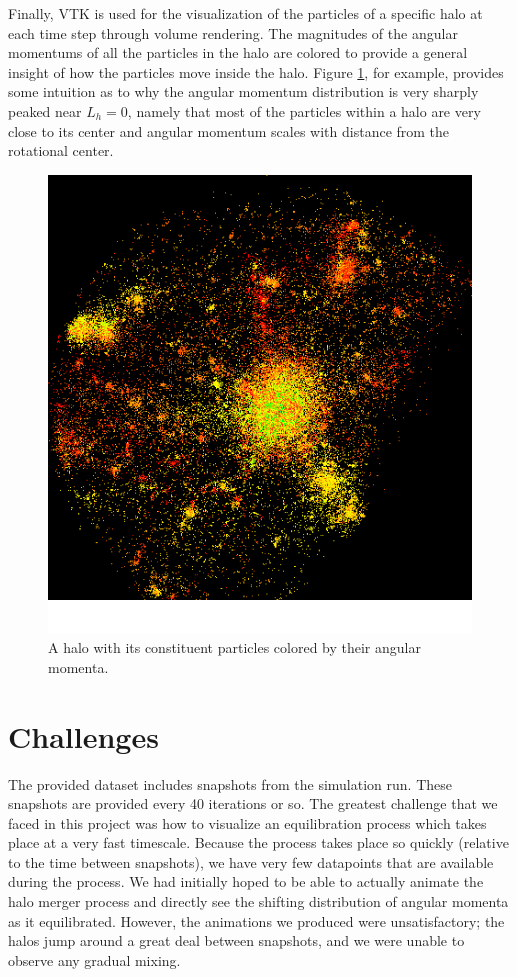 \documentclass[12pt]{article}
\begin{document}
Finally, VTK is used for the visualization of the particles of a specific halo
at each time step through volume rendering. The magnitudes of the angular
momentums of all the particles in the halo are colored to provide a general
insight of how the particles move inside the halo. Figure
\ref{fig:halo_particles}, for example, provides some intuition as to why the
angular momentum distribution is very sharply peaked near $L_h = 0$, namely
that most of the particles within a halo are very close to its center and
angular momentum scales with distance from the rotational center.

\begin{figure}[htp]
\centering
\includegraphics[width=0.5\columnwidth]{../figures/halo_particles.png}
\caption{A halo with its constituent particles colored by their angular momenta.}
\label{fig:halo_particles}
\end{figure}

\section{Challenges}
\label{sec:challenges}
The provided dataset includes snapshots from the simulation run. These
snapshots are provided every 40 iterations or so. The greatest challenge that
we faced in this project was how to visualize an equilibration process which
takes place at a very fast timescale. Because the process takes place so
quickly (relative to the time between snapshots), we have very few datapoints
that are available during the process. We had initially hoped to be able to
actually animate the halo merger process and directly see the shifting
distribution of angular momenta as it equilibrated. However, the animations we
produced were unsatisfactory; the halos jump around a great deal between
snapshots, and we were unable to observe any gradual mixing.
\end{document}
